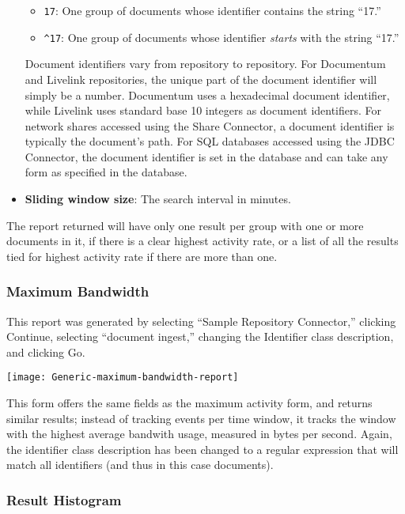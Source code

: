 \begin{changemargin}{1.5in}{0in}
\begin{itemize}
\begin{itemize}
\item \texttt{17}: One group of documents whose identifier contains
the string ``17.''

\item \texttt{\^{}17}: One group of documents whose identifier \emph{starts}
with the string ``17.''

\end{itemize}

Document identifiers vary from repository to repository. For Documentum
and Livelink repositories, the unique part of the document identifier will
simply be a number. Documentum uses a hexadecimal document identifier,
while Livelink uses standard base 10 integers as document identifiers. For
network shares accessed using the Share Connector, a document identifier
is typically the document's path. For SQL databases accessed using
the JDBC Connector, the document identifier is set in the database and
can take any form as specified in the database.

\item \textbf{Sliding window size}: The search interval in minutes.

\end{itemize}

The report returned will have only one result per group with one or more
documents in it, if there is a clear highest activity rate, or a list of
all the results tied for highest activity rate if there are more than one.

\subsubsection{Maximum Bandwidth}

This report was generated by selecting ``Sample Repository Connector,''
clicking Continue, selecting ``document ingest,'' changing the Identifier
class description, and clicking Go.

\texttt{[image: Generic-maximum-bandwidth-report]}

This form offers the same fields as the maximum activity form, and
returns similar results; instead of tracking events per time window,
it tracks the window with the highest average bandwith usage, measured
in bytes per second. Again, the identifier class description has been
changed to a regular expression that will match all identifiers (and
thus in this case documents).

\subsubsection{Result Histogram}


\end{changemargin}
